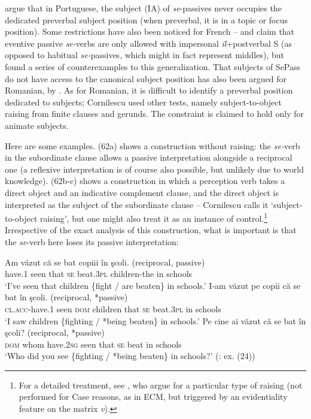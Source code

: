 \documentclass[output=paper]{langsci/langscibook}
\begin{document}
\citet{Raposo1996} argue that in Portuguese, the subject (IA) of \textit{se}{}-passives never occupies the dedicated preverbal subject position (when preverbal, it is in a topic or focus position). Some restrictions have also been noticed for French – \citet{Stéfanini1962} and \citet{Ruwet1972} claim that eventive passive \textit{se-}verbs are only allowed with impersonal \textit{il}+postverbal S (as opposed to habitual \textit{se-}passives, which might in fact represent middles), but \citet{Zribi-Hertz1982,Zribi-Hertz2008} found a series of counterexamples to this generalization. That subjects of SePass do not have access to the canonical subject position has also been argued for Romanian, by \citet{Cornilescu1998}. As for Romanian, it is difficult to identify a preverbal position dedicated to subjects; Cornilescu used other tests, namely subject-to-object raising from finite clauses and gerunds. The constraint is claimed to hold only for animate subjects.

Here are some examples. (62a) shows a construction without raising: the \textit{se-}verb in the subordinate clause allows a passive interpretation alongside a reciprocal one (a reflexive interpretation is of course also possible, but unlikely due to world knowledge). (62b-c) shows a construction in which a perception verb takes a direct object and an indicative complement clause, and the direct object is interpreted as the subject of the subordinate clause – Cornilescu calls it ‘subject-to-object raising’, but one might also treat it as an instance of control.\footnote{For a detailed treatment, see \citet{Alboiu2013,Alboiu2016}, who argue for a particular type of raising (not performed for Case reasons, as in ECM, but triggered by an evidentiality feature on the matrix \textit{v}).} Irrespective of the exact analysis of this construction, what is important is that the \textit{se}{}-verb here loses its passive interpretation:

\ea%
    \label{ex:giurgea:62}
\ea
    \gll Am     văzut că   se bat          copiii           în şcoli. (reciprocal, passive)    \\
          have.\textsc{1} seen that \textsc{se} beat.\textsc{3pl} children-the in schools\\
    \glt ‘I’ve seen that children \{fight / are beaten\} in schools.’
\ex
    \gll  I-am              văzut pe    copii      că   se  bat         în şcoli. (reciprocal, *passive)\\
          \textsc{cl.acc-}have.\textsc{1} seen  \textsc{dom} children that \textsc{se} beat.\textsc{3pl} in schools\\
    \glt  ‘I saw children \{fighting / *being beaten\} in schools.’
\ex
    \gll Pe    cine     ai            văzut că   se bat  în şcoli?  (reciprocal, *passive)\\
         \textsc{dom} whom have.\textsc{2sg} seen that \textsc{se} beat in schools\\
    \glt ‘Who did you see \{fighting / *being beaten\} in schools?’ (\citealt{Cornilescu1998}: ex. (24))   
\z
\z
\end{document}
